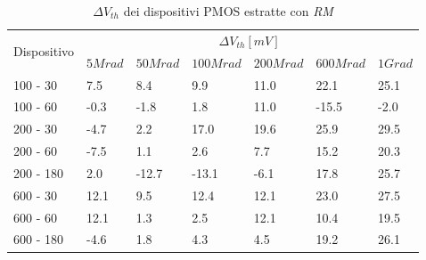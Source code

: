 \documentclass[12pt, letterpaper]{book}
\begin{document}
\begin{table}[H]
  \renewcommand{\arraystretch}{1.3}
  \begin{tabular}{m{2cm}  m{1.1cm} m{1.3cm} m{1.5cm} m{1.5cm} m{1.5cm} m{1cm}}
    \toprule
    \multirow{2}{*}{Dispositivo} & \multicolumn{6}{c}{$\Delta V_{th} [mV] $}                                                          \\
    \cmidrule{2-7}
                                 & $5Mrad$                            & $50Mrad$ & $100Mrad$ & $200Mrad$ & $600Mrad$ & $1Grad$ \\
    \midrule
    100 - 30                     & 7.5                                & 8.4      & 9.9       & 11.0      & 22.1      & 25.1    \\
    \hline
    100 - 60                     & -0.3                               & -1.8     & 1.8       & 11.0      & -15.5     & -2.0    \\
    \hline
    200 - 30                     & -4.7                               & 2.2      & 17.0      & 19.6      & 25.9      & 29.5    \\
    \hline
    200 - 60                     & -7.5                               & 1.1      & 2.6       & 7.7       & 15.2      & 20.3    \\
    \hline
    200 - 180                    & 2.0                                & -12.7    & -13.1     & -6.1      & 17.8      & 25.7    \\
    \hline
    600 - 30                     & 12.1                               & 9.5      & 12.4      & 12.1      & 23.0      & 27.5    \\
    \hline
    600 - 60                     & 12.1                               & 1.3      & 2.5       & 12.1      & 10.4      & 19.5    \\
    \hline
    600 - 180                    & -4.6                               & 1.8      & 4.3       & 4.5       & 19.2      & 26.1    \\
    \bottomrule
  \end{tabular}
  \caption{$\Delta V_{th}$ dei dispositivi PMOS estratte con \emph{RM}}
  \label{tab:deltaVthRMP}
\end{table}
\end{document}

